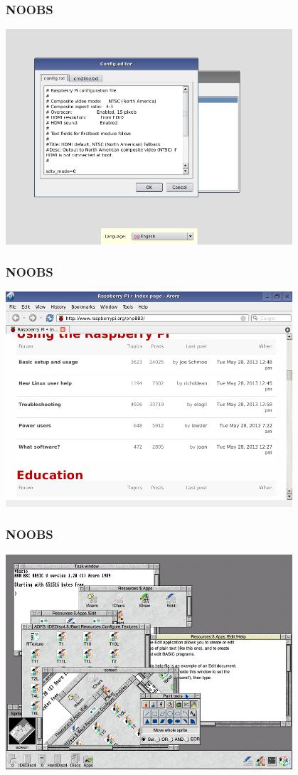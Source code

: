 \documentclass[10pt,colorlinks]{beamer}
\begin{document}
\begin{frame}[fragile]\frametitle{NOOBS}
\includegraphics[width=0.8\textwidth]{figs/noobs2}
\end{frame}

\begin{frame}[fragile]\frametitle{NOOBS}
\includegraphics[width=0.8\textwidth]{figs/noobs3}
\end{frame}


\begin{frame}[fragile]\frametitle{NOOBS}
\includegraphics[width=0.8\textwidth]{figs/riscos}
\end{frame}
\end{document}

